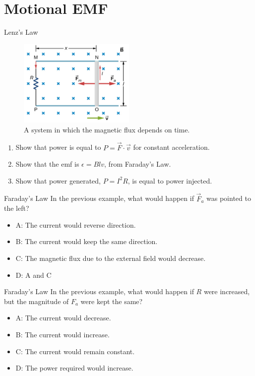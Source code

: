 \documentclass{beamer}
\begin{document}
\section{Motional EMF}

\begin{frame}{Lenz's Law}
\small
\begin{figure}
\centering
\includegraphics[width=0.5\textwidth]{figures/loop2.png}
\caption{\label{fig:loop4} A system in which the magnetic flux depends on time.}
\end{figure}
\begin{enumerate}
\item Show that power is equal to $P = \vec{F} \cdot \vec{v}$ for constant acceleration.
\item Show that the emf is $\epsilon = B l v$, from Faraday's Law.
\item Show that power generated, $P = I^2 R$, is equal to power injected.
\end{enumerate}
\end{frame}

\begin{frame}{Faraday's Law}
In the previous example, what would happen if $\vec{F}_a$ was pointed to the left?
\begin{itemize}
\item A: The current would reverse direction.
\item B: The current would keep the same direction.
\item C: The magnetic flux due to the external field would decrease.
\item D: A and C
\end{itemize}
\end{frame}

\begin{frame}{Faraday's Law}
In the previous example, what would happen if $R$ were increased, but the magnitude of $F_a$ were kept the same?
\begin{itemize}
\item A: The current would decrease.
\item B: The current would increase.
\item C: The current would remain constant.
\item D: The power required would increase.
\end{itemize}
\end{frame}
\end{document}

